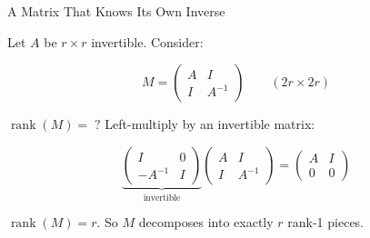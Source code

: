 \documentclass[10pt]{beamer}
\theoremstyle{definition}
\begin{document}
\begin{frame}{A Matrix That Knows Its Own Inverse}

Let $A$ be $r \times r$ invertible. Consider:

$$M = \begin{pmatrix} A & I \\ I & A^{-1} \end{pmatrix} \qquad (2r \times 2r)$$

\vspace{0.3em}

$\operatorname{rank}(M) = \;?$ \;\; Left-multiply by an invertible matrix:

$$\underbrace{\begin{pmatrix} I & 0 \\ -A^{-1} & I \end{pmatrix}}_{\text{invertible}} \begin{pmatrix} A & I \\ I & A^{-1} \end{pmatrix} = \begin{pmatrix} A & I \\ 0 & 0 \end{pmatrix}$$

\vspace{0.3em}

$\operatorname{rank}(M) = r$. \; So $M$ decomposes into exactly $r$ rank-1 pieces.

\end{frame}
\end{document}
